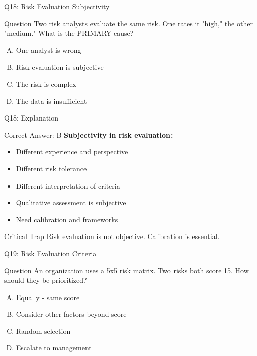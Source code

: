\documentclass{beamer}
\begin{document}
			\begin{frame}{Q18: Risk Evaluation Subjectivity}
				\begin{block}{Question}
					Two risk analysts evaluate the same risk. One rates it "high," the other "medium." What is the PRIMARY cause?
				\end{block}
				\begin{enumerate}[(A)]
					\item One analyst is wrong
					\item Risk evaluation is subjective
					\item The risk is complex
					\item The data is insufficient
				\end{enumerate}
			\end{frame}
			
			\begin{frame}{Q18: Explanation}
				\begin{block}{Correct Answer: B}
					\textbf{Subjectivity in risk evaluation:}
					\begin{itemize}
						\item Different experience and perspective
						\item Different risk tolerance
						\item Different interpretation of criteria
						\item Qualitative assessment is subjective
						\item Need calibration and frameworks
					\end{itemize}
				\end{block}
				\begin{alertblock}{Critical Trap}
					Risk evaluation is not objective. Calibration is essential.
				\end{alertblock}
			\end{frame}
			
			\begin{frame}{Q19: Risk Evaluation Criteria}
				\begin{block}{Question}
					An organization uses a 5x5 risk matrix. Two risks both score 15. How should they be prioritized?
				\end{block}
				\begin{enumerate}[(A)]
					\item Equally - same score
					\item Consider other factors beyond score
					\item Random selection
					\item Escalate to management
				\end{enumerate}
			\end{frame}
			
\end{document}

